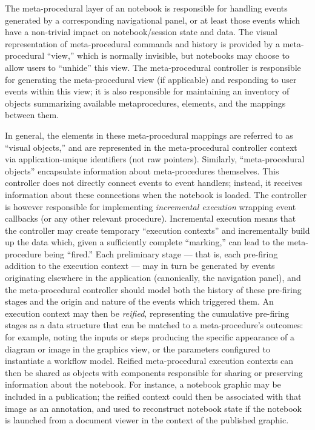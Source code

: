 \documentclass[11pt,letterpaper]{article}
\newcommand{\ATextCClr}[1]{\textcolor{atcColor}{\textbf{#1}}}
\newcommand{\MdsX}{\resizebox{!}{7.5pt}{\ATextCClr{MdsX}}}
\newcommand{\GUI}{\resizebox{!}{7pt}{\AcronymText{GUI}}}
\newcommand{\textscc}[1]{{\color{orr!35!black}{{%
						\fontfamily{Cabin-TLF}\fontseries{b}\selectfont{\textsc{\scriptsize{#1}}}}}}}
\newcommand{\AcronymText}[1]{{\textscc{#1}}}
\newcommand{\p}[1]{

\vspace{1em}#1}
\newcommand{\q}[1]{{\fontfamily{qcr}\selectfont ``}#1{\fontfamily{qcr}\selectfont ''}}
\begin{document}
{\p{The meta-procedural layer of an \MdsX{} notebook 
is responsible for handling events generated 
by a corresponding navigational panel, or at 
least those events which have a 
non-trivial impact on notebook/session 
state and data.  The visual representation of 
meta-procedural commands and history is 
provided by a meta-procedural \q{view,} which 
is normally invisible, but notebooks may 
choose to allow users to \q{unhide} this view.  
The meta-procedural controller is responsible 
for generating the meta-procedural view (if 
applicable) and responding to user events 
within this view; it is also responsible for 
maintaining an inventory of objects summarizing 
available metaprocedures, \GUI{} elements, 
and the mappings between them.}


\p{In general, the \GUI{} elements in these 
meta-procedural mappings are referred to as 
\q{visual objects,} and are represented 
in the meta-procedural controller context via 
application-unique identifiers (not raw pointers).  
Similarly, \q{meta-procedural objects} encapsulate 
information about meta-procedures themselves.  
This controller does not directly connect 
\GUI{} events to event handlers; instead, it 
receives information about these connections when 
the notebook is loaded.  The controller is however 
responsible for implementing \textit{incremental 
execution} wrapping event callbacks (or any other 
relevant procedure).  Incremental execution 
means that the controller may create 
temporary \q{execution contexts} and incrementally 
build up the data which, given a sufficiently 
complete \q{marking,} can lead to the 
meta-procedure being \q{fired.}  Each 
preliminary stage --- that is, each pre-firing 
addition to the execution context --- may in 
turn be generated by events originating elsewhere 
in the application (canonically, the 
navigation panel), and the meta-procedural controller 
should model both the history of these pre-firing stages 
and the origin and nature of the events which 
triggered them.  An execution context 
may then be \textit{reified}, representing the 
cumulative pre-firing stages as a data structure 
that can be matched to a meta-procedure's 
outcomes: for example, noting the 
inputs or steps producing the specific appearance 
of a diagram or image in the graphics view, 
or the parameters configured to instantiate 
a workflow model.  Reified meta-procedural 
execution contexts can then be shared as 
objects with components responsible for 
sharing or preserving information about the 
notebook.  For instance, a notebook graphic may be 
included in a publication; the reified context 
could then be associated with that image as an 
annotation, and used to reconstruct notebook 
state if the notebook is launched from a 
document viewer in the context of the 
published graphic.}

}
\end{document}
